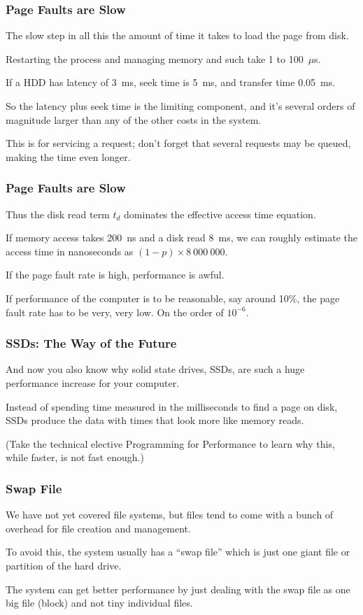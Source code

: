 \begin{frame}
\frametitle{Page Faults are Slow}

The slow step in all this the amount of time it takes to load the page from disk. 

Restarting the process and managing memory and such take 1 to 100~$\mu$s.

If a HDD has latency of 3~ms, seek time is 5~ms, and transfer time 0.05~ms. 

So the latency plus seek time is the limiting component, and it's several orders of magnitude larger than any of the other costs in the system. 

This is for servicing a request; don't forget that several requests may be queued, making the time even longer.

\end{frame}

\begin{frame}
\frametitle{Page Faults are Slow}

Thus the disk read term $t_{d}$ dominates the effective access time equation. 

If memory access takes 200~ns and a disk read 8~ms, we can roughly estimate the access time in nanoseconds as $(1-p) \times 8~000~000$. 

If the page fault rate is high, performance is awful. 

If performance of the computer is to be reasonable, say around 10\%, the page fault rate has to be very, very low. On the order of $10^{-6}$. 

\end{frame}

\begin{frame}
\frametitle{SSDs: The Way of the Future}

And now you also know why solid state drives, SSDs, are such a huge performance increase for your computer. 

Instead of spending time measured in the milliseconds to find a page on disk, SSDs produce the data with times that look more like memory reads.

(Take the technical elective Programming for Performance to learn why this, while faster, is not fast enough.)


\end{frame}

\begin{frame}
\frametitle{Swap File}

We have not yet covered file systems, but files tend to come with a bunch of overhead for file creation and management. 

To avoid this, the system usually has a ``swap file'' which is just one giant file or partition of the hard drive. 

The system can get better performance by just dealing with the swap file as one big file (block) and not tiny individual files.



\end{frame}

